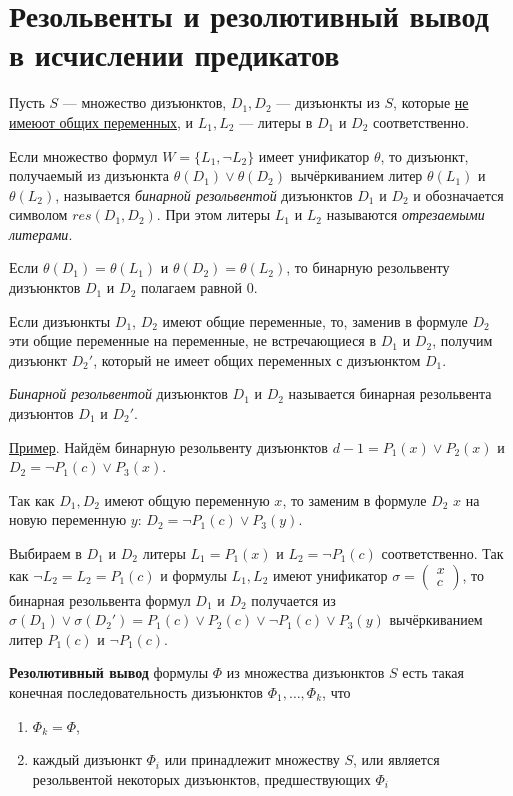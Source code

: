 \section{Резольвенты и резолютивный вывод в исчислении предикатов}
Пусть $S$ --- множество дизъюнктов, $D_1, D_2$ --- дизъюнкты из $S$, которые \underline{не имеюот общих переменных}, и $L_1, L_2$ --- литеры в $D_1$ и $D_2$ соответственно.

Если множество формул $W=\{L_1, \lnot L_2\}$ имеет унификатор $\theta$, то дизъюнкт, получаемый из дизъюнкта $\theta(D_1) \lor \theta(D_2)$ вычёркиванием литер $\theta(L_1)$ и $\theta(L_2)$, называется \textit{бинарной резольвентой} дизъюнктов $D_1$ и $D_2$ и обозначается символом $res(D_1, D_2)$. При этом литеры $L_1$ и $L_2$ называются \textit{отрезаемыми литерами}.

Если $\theta(D_1) = \theta(L_1)$ и $\theta(D_2) = \theta(L_2)$, то бинарную резольвенту дизъюнктов $D_1$ и $D_2$ полагаем равной 0.

Если дизъюнкты $D_1$, $D_2$ имеют общие переменные, то, заменив в формуле $D_2$ эти общие переменные на переменные, не встречающиеся в $D_1$ и $D_2$, получим дизъюнкт $D_2'$, который не имеет общих переменных с дизъюнктом $D_1$.

\textit{Бинарной резольвентой} дизъюнктов $D_1$ и $D_2$ называется бинарная резольвента дизъюнтов $D_1$ и $D_2'$.

\underline{Пример}. Найдём бинарную резольвенту дизъюнктов $d-1 = P_1(x) \lor P_2(x)$ и $D_2 = \lnot P_1(c) \lor P_3(x)$.

Так как $D_1, D_2$ имеют общую переменную $x$, то заменим в формуле $D_2$ $x$ на новую переменную $y$: $D_2 = \lnot P_1(c) \lor P_3(y)$.

Выбираем в $D_1$ и $D_2$ литеры $L_1 = P_1(x)$ и $L_2 = \lnot P_1(c)$ соответственно. Так как $\lnot L_2 = L_2 = P_1(c)$ и формулы $L_1, L_2$ имеют унификатор $\sigma = \left(
    \begin{matrix}
        x \\
        c
    \end{matrix}
\right)$, то бинарная резольвента формул $D_1$ и $D_2$ получается из $\sigma(D_1) \lor \sigma(D_2')=P_1(c)\lor P_2(c)\lor\lnot P_1(c) \lor P_3(y)$ вычёркиванием литер $P_1(c)$ и $\lnot P_1(c)$.

\dftion \textbf{Резолютивный вывод} формулы $\Phi$ из множества дизъюнктов $S$ есть такая конечная последовательность дизъюнктов $\Phi_1,\dots,\Phi_k$, что
\begin{enumerate}
    \item $\Phi_k = \Phi$,
    \item каждый дизъюнкт $\Phi_i$ или принадлежит множеству $S$, или является резольвентой некоторых дизъюнктов, предшествующих $\Phi_i$
\end{enumerate}

